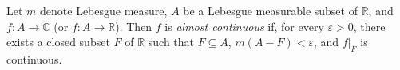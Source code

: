 \documentclass[12pt]{article}
\begin{document}
Let $m$ denote Lebesgue measure, $A$ be a Lebesgue measurable subset of $\mathbb{R}$, and $f:A \to \mathbb{C}$ (or $f:A \to \mathbb{R}$).  Then $f$ is \emph{almost continuous} if, for every $\varepsilon>0$, there exists a closed subset $F$ of $\mathbb{R}$ such that $F \subseteq A$, $m(A-F)<\varepsilon$, and $f|_F$ is continuous.
\end{document}
